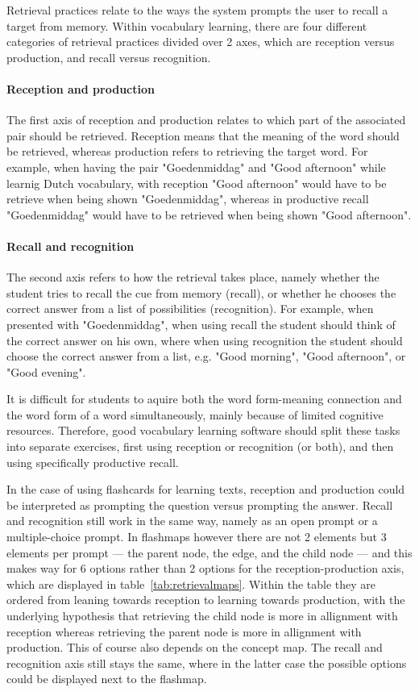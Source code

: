 Retrieval practices relate to the ways the system prompts the user to recall a target from memory. Within vocabulary learning, there are four different categories of retrieval practices divided over 2 axes, which are reception versus production, and recall versus recognition. 

\paragraph{Reception and production} The first axis of reception and production relates to which part of the associated pair should be retrieved. Reception means that the meaning of the word should be retrieved, whereas production refers to retrieving the target word. For example, when having the pair "Goedenmiddag" and "Good afternoon" while learnig Dutch vocabulary, with reception "Good afternoon" would have to be retrieve when being shown "Goedenmiddag", whereas in productive recall "Goedenmiddag" would have to be retrieved when being shown "Good afternoon".

\paragraph{Recall and recognition} The second axis refers to how the retrieval takes place, namely whether the student tries to recall the cue from memory (recall), or whether he chooses the correct answer from a list of possibilities (recognition). For example, when presented with "Goedenmiddag", when using recall the student should think of the correct answer on his own, where when using recognition the student should choose the correct answer from a list, e.g. "Good morning", "Good afternoon", or "Good evening".

It is difficult for students to aquire both the word form-meaning connection and the word form of a word simultaneously, mainly because of limited cognitive resources. Therefore, good vocabulary learning software should split these tasks into separate exercises, first using reception or recognition (or both), and then using specifically productive recall.

In the case of using flashcards for learning texts, reception and production could be interpreted as prompting the question versus prompting the answer. Recall and recognition still work in the same way, namely as an open prompt or a multiple-choice prompt. In flashmaps however there are not 2 elements but 3 elements per prompt --- the parent node, the edge, and the child node --- and this makes way for 6 options rather than 2 options for the reception-production axis, which are displayed in table~\ref{tab:retrievalmaps}. Within the table they are ordered from leaning towards reception to learning towards production, with the underlying hypothesis that retrieving the child node is more in allignment with reception whereas retrieving the parent node is more in allignment with production. This of course also depends on the concept map. The recall and recognition axis still stays the same, where in the latter case the possible options could be displayed next to the flashmap.


